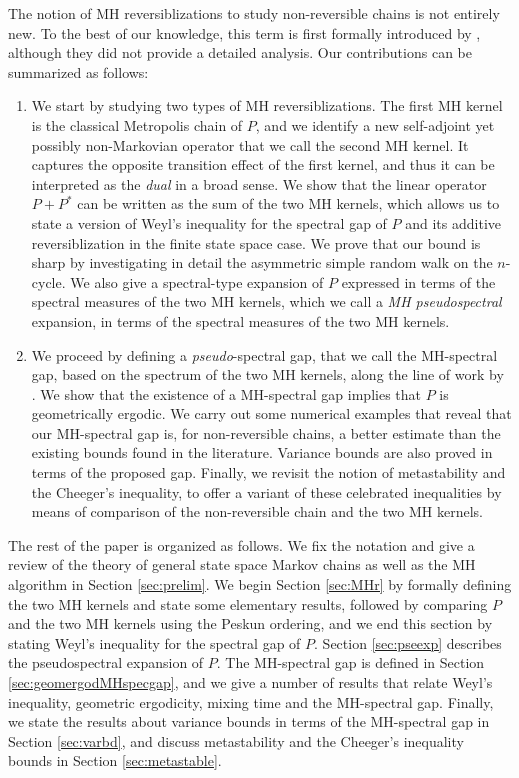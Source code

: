 \documentclass[12pt,a4]{amsart}
\numberwithin{equation}{section}
\theoremstyle{plain}
\theoremstyle{definition}
\theoremstyle{remark}
\newcommand{\1}{\mathds{1}}
\begin{document}
The notion of MH reversiblizations to study non-reversible chains is not entirely new. To the best of our knowledge, this term is first formally introduced by \cite{AF14}, although they did not provide a detailed analysis. Our contributions can be summarized as follows:
\begin{enumerate}
	\item We start by studying two types of MH reversiblizations. The first MH kernel is the classical Metropolis chain of $P$, and we identify a new self-adjoint yet possibly non-Markovian operator that we call the second MH kernel. It captures the opposite transition effect of the first kernel, and thus it can be interpreted as the \emph{dual} in a broad sense. We show that the linear operator $P + P^*$ can be written as the sum of the two MH kernels, which allows us to state a version of Weyl's inequality for the spectral gap of $P$ and its additive reversiblization in the finite state space case. We prove that our bound is sharp by investigating in detail the asymmetric simple random walk on the $n$-cycle. We also give  a spectral-type expansion of $P$ expressed in terms of the spectral measures of the two MH kernels, which we call a \textit{MH pseudospectral} expansion, in terms of the spectral measures of the two MH kernels.
	
	\item We proceed by defining a \textit{pseudo}-spectral gap, that we call the MH-spectral gap, based on the spectrum of the two MH kernels, along the line of work by \cite{Paulin15}. We show that the existence of a MH-spectral gap implies that $P$ is geometrically ergodic. We carry out some numerical examples that reveal that our MH-spectral gap is, for non-reversible chains, a better estimate than the existing bounds found in the literature. Variance bounds are also proved in terms of the proposed gap. Finally, we revisit the notion of metastability and the Cheeger's inequality, to offer a variant of these celebrated inequalities by means of comparison of the non-reversible chain and the two MH kernels.
\end{enumerate}

The rest of the paper is organized as follows. We fix the notation and give a review of the theory of general state space Markov chains as well as the MH algorithm in Section \ref{sec:prelim}. We begin Section \ref{sec:MHr} by formally defining the two MH kernels and state some elementary results, followed by comparing $P$ and the two MH kernels using the Peskun ordering, and we end this section by stating Weyl's inequality for the spectral gap of $P$. Section \ref{sec:pseexp} describes the pseudospectral expansion of $P$. The MH-spectral gap is defined in Section \ref{sec:geomergodMHspecgap}, and we give a number of results that relate Weyl's inequality, geometric ergodicity, mixing time and the MH-spectral gap. Finally, we state the results about variance bounds in terms of the MH-spectral gap in Section \ref{sec:varbd}, and discuss metastability and the Cheeger's inequality bounds in Section \ref{sec:metastable}.
\end{document}
